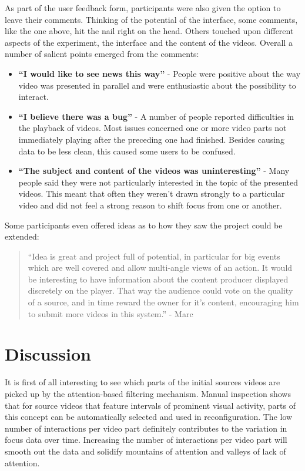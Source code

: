 As part of the user feedback form, participants were also given the option to leave their comments. Thinking of the potential of the interface, some comments, like the one above, hit the nail right on the head. Others touched upon different aspects of the experiment, the interface and the content of the videos. Overall a number of salient points emerged from the comments:

\begin{itemize}
  \item \textbf{``I would like to see news this way''} - People were positive about the way video was presented in parallel and were enthusiastic about the possibility to interact.
  \item \textbf{``I believe there was a bug''} - A number of people reported difficulties in the playback of videos. Most issues concerned one or more video parts not immediately playing after the preceding one had finished. Besides causing data to be less clean, this caused some users to be confused.
  \item \textbf{``The subject and content of the videos was uninteresting''} - Many people said they were not particularly interested in the topic of the presented videos. This meant that often they weren't drawn strongly to a particular video and did not feel a strong reason to shift focus from one or another.
\end{itemize}

Some participants even offered ideas as to how they saw the project could be extended:

\begin{quote}
  ``Idea is great and project full of potential, in particular for big events which are well covered and allow multi-angle views of an action. It would be interesting to have information about the content producer displayed discretely on the player. That way the audience could vote on the quality of a source, and in time reward the owner for it's content, encouraging him to submit more videos in this system.'' - Marc
\end{quote}



\section{Discussion} %
\label{sec:discussion}

It is first of all interesting to see which parts of the initial sources videos are picked up by the attention-based filtering mechanism. Manual inspection shows that for source videos that feature intervals of prominent visual activity, parts of this concept can be automatically selected and used in reconfiguration. The low number of interactions per video part definitely contributes to the variation in focus data over time. Increasing the number of interactions per video part will smooth out the data and solidify mountains of attention and valleys of lack of attention.

